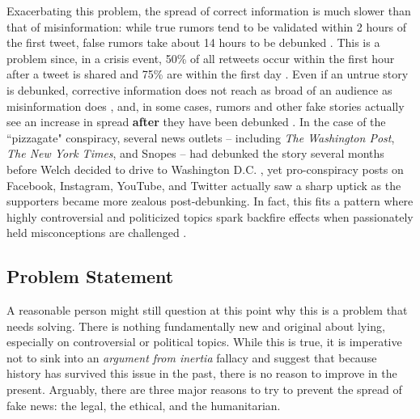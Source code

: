 \documentclass[preprint,review,12pt]{elsarticle}
\begin{document}
Exacerbating this problem, the spread of correct information is much slower than that of misinformation: while true rumors tend to be validated within 2 hours of the first tweet, false rumors take about 14 hours to be debunked \cite{zubiaga2016analysing,shao2016hoaxy}. This is a problem since, in a crisis event, 50\% of all retweets occur within the first hour after a tweet is shared and 75\% are within the first day \cite{kwak2010twitter}. Even if an untrue story is debunked, corrective information does not reach as broad of an audience as misinformation does \cite{maddock2015characterizing, vosoughi2018spread}, and, in some cases, rumors and other fake stories actually see an increase in spread \textbf{after} they have been debunked \cite{starbird2014rumors}. In the case of the ``pizzagate" conspiracy, several news outlets -- including \textit{The Washington Post}, \textit{The New York Times}, and Snopes -- had debunked the story several months before Welch decided to drive to Washington D.C. \cite{kang2016fake,lacapria2016fact,board_2016}, yet pro-conspiracy posts on Facebook, Instagram, YouTube, and Twitter actually saw a sharp uptick as the supporters became more zealous post-debunking\cite{kang2016washington}. In fact, this fits a pattern where highly controversial and politicized topics spark backfire effects when passionately held misconceptions are challenged \cite{gollust2009polarizing,nyhan2010corrections,nyhan2013hazards,redlawsk2010affective,schaffner2016misinformation,hart2012boomerang}.

\subsection{Problem Statement}
\label{Problem Statement}
A reasonable person might still question at this point why this is a problem that needs solving. There is nothing fundamentally new and original about lying, especially on controversial or political topics. While this is true, it is imperative not to sink into an \textit{argument from inertia} fallacy \cite{bennett2012logically} and suggest that because history has survived this issue in the past, there is no reason to improve in the present. Arguably, there are three major reasons to try to prevent the spread of fake news: the legal, the ethical, and the humanitarian.
\end{document}
